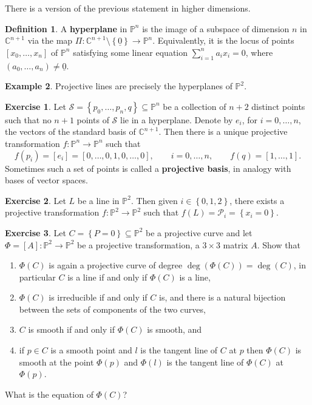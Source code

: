 \documentclass{article}
\newcommand{\C}{\mathbb{C}}
\renewcommand{\P}{\mathbb{P}}
\newcommand{\rb}[1]{\left( #1 \right)}
\renewcommand{\sb}[1]{\left[ #1 \right]}
\newcommand{\cb}[1]{\left\{ #1 \right\}}
\theoremstyle{definition}\newtheorem{definition}{Definition}[section]
\theoremstyle{definition}\newtheorem{notation}[definition]{Notation}
\theoremstyle{definition}\newtheorem{remark}[definition]{Remark}
\theoremstyle{definition}\newtheorem{example}[definition]{Example}
\theoremstyle{definition}\newtheorem{fact}{Fact}
\theoremstyle{definition}\newtheorem{exercise}{Exercise}
\begin{document}
There is a version of the previous statement in higher dimensions.

\begin{definition}
A \textbf{hyperplane} in $ \P^n $ is the image of a subspace of dimension $ n $ in $ \C^{n + 1} $ via the map $ \Pi : \C^{n + 1} \setminus \cb{\underline{0}} \to \P^n $. Equivalently, it is the locus of points $ \sb{x_0, \dots, x_n} $ of $ \P^n $ satisfying some linear equation $ \sum_{i = 1}^n a_ix_i = 0 $, where $ \rb{a_0, \dots, a_n} \ne \underline{0} $.
\end{definition}

\begin{example}
Projective lines are precisely the hyperplanes of $ \P^2 $.
\end{example}

\begin{exercise}
Let $ \mathcal{S} = \cb{p_0, \dots, p_n, q} \subseteq \P^n $ be a collection of $ n + 2 $ distinct points such that no $ n + 1 $ points of $ \mathcal{S} $ lie in a hyperplane. Denote by $ e_i $, for $ i = 0, \dots, n $, the vectors of the standard basis of $ \C^{n + 1} $. Then there is a unique projective transformation $ f : \P^n \to \P^n $ such that
$$ f\rb{p_i} = \sb{e_i} = \sb{0, \dots, 0, 1, 0, \dots, 0}, \qquad i = 0, \dots, n, \qquad f\rb{q} = \sb{1, \dots, 1}. $$
Sometimes such a set of points is called a \textbf{projective basis}, in analogy with bases of vector spaces.
\end{exercise}

\begin{exercise}
Let $ L $ be a line in $ \P^2 $. Then given $ i \in \cb{0, 1, 2} $, there exists a projective transformation $ f : \P^2 \to \P^2 $ such that $ f\rb{L} = \mathcal{P}_i = \cb{x_i = 0} $.
\end{exercise}

\begin{exercise}
\label{ex:29}
Let $ C = \cb{P = 0} \subseteq \P^2 $ be a projective curve and let $ \Phi = \sb{A} : \P^2 \to \P^2 $ be a projective transformation, a $ 3 \times 3 $ matrix $ A $. Show that
\begin{enumerate}
\item $ \Phi\rb{C} $ is again a projective curve of degree $ \deg\rb{\Phi\rb{C}} = \deg\rb{C} $, in particular $ C $ is a line if and only if $ \Phi\rb{C} $ is a line,
\item $ \Phi\rb{C} $ is irreducible if and only if $ C $ is, and there is a natural bijection between the sets of components of the two curves,
\item $ C $ is smooth if and only if $ \Phi\rb{C} $ is smooth, and
\item if $ p \in C $ is a smooth point and $ l $ is the tangent line of $ C $ at $ p $ then $ \Phi\rb{C} $ is smooth at the point $ \Phi\rb{p} $ and $ \Phi\rb{l} $ is the tangent line of $ \Phi\rb{C} $ at $ \Phi\rb{p} $.
\end{enumerate}
What is the equation of $ \Phi\rb{C} $?
\end{exercise}
\end{document}
